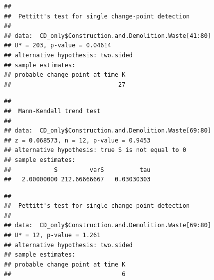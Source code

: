 \documentclass[12pt,]{article}
\newenvironment{Shaded}{\begin{snugshade}}{\end{snugshade}}
\newcommand{\KeywordTok}[1]{\textcolor[rgb]{0.13,0.29,0.53}{\textbf{#1}}}
\newcommand{\DecValTok}[1]{\textcolor[rgb]{0.00,0.00,0.81}{#1}}
\newcommand{\CommentTok}[1]{\textcolor[rgb]{0.56,0.35,0.01}{\textit{#1}}}
\newcommand{\OperatorTok}[1]{\textcolor[rgb]{0.81,0.36,0.00}{\textbf{#1}}}
\newcommand{\NormalTok}[1]{#1}
\begin{document}
\begin{verbatim}
## 
##  Pettitt's test for single change-point detection
## 
## data:  CD_only$Construction.and.Demolition.Waste[41:80]
## U* = 203, p-value = 0.04614
## alternative hypothesis: two.sided
## sample estimates:
## probable change point at time K 
##                              27
\end{verbatim}

\begin{Shaded}
\end{Shaded}

\begin{verbatim}
## 
##  Mann-Kendall trend test
## 
## data:  CD_only$Construction.and.Demolition.Waste[69:80]
## z = 0.068573, n = 12, p-value = 0.9453
## alternative hypothesis: true S is not equal to 0
## sample estimates:
##            S         varS          tau 
##   2.00000000 212.66666667   0.03030303
\end{verbatim}

\begin{Shaded}
\end{Shaded}

\begin{verbatim}
## 
##  Pettitt's test for single change-point detection
## 
## data:  CD_only$Construction.and.Demolition.Waste[69:80]
## U* = 12, p-value = 1.261
## alternative hypothesis: two.sided
## sample estimates:
## probable change point at time K 
##                               6
\end{verbatim}
\end{document}
